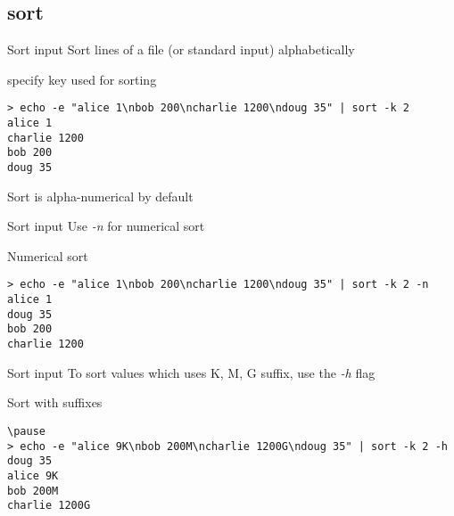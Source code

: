 \subsection{sort}

\begin{frame}[fragile]{Sort input}
Sort lines of a file (or standard input) alphabetically
  \pause
  \begin{exampleblock}{specify key used for sorting}
    \begin{lstlisting}[showstringspaces=false,basicstyle=\tiny]
> echo -e "alice 1\nbob 200\ncharlie 1200\ndoug 35" | sort -k 2
alice 1
charlie 1200
bob 200
doug 35
    \end{lstlisting}
  \end{exampleblock}
\pause
Sort is alpha-numerical by default
\end{frame}

\begin{frame}[fragile]{Sort input}
Use \emph{-n} for numerical sort
  \pause
  \begin{exampleblock}{Numerical sort}
    \begin{lstlisting}[showstringspaces=false,basicstyle=\tiny]
> echo -e "alice 1\nbob 200\ncharlie 1200\ndoug 35" | sort -k 2 -n
alice 1
doug 35
bob 200
charlie 1200
    \end{lstlisting}
  \end{exampleblock}
\end{frame}


\begin{frame}[fragile]{Sort input}
To sort values which uses K, M, G suffix, use the \emph{-h} flag
\pause
  \begin{exampleblock}{Sort with suffixes}
    \begin{lstlisting}[showstringspaces=false,basicstyle=\tiny]
\pause
> echo -e "alice 9K\nbob 200M\ncharlie 1200G\ndoug 35" | sort -k 2 -h
doug 35
alice 9K
bob 200M
charlie 1200G
    \end{lstlisting}
  \end{exampleblock}
\end{frame}
